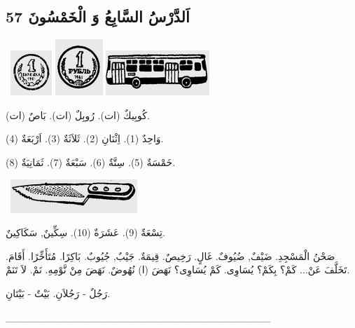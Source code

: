 \documentclass[a5paper]{article}
\begin{document}
\subsection{اَلدَّرْسُ السَّابِعُ وَ الْخَمْسُونَ 57 }
\  \includegraphics[width=0.6146in,height=0.6665in]{MuhammadBagauddinlatinized-img186.png}   \includegraphics[width=0.7083in,height=0.8335in]{MuhammadBagauddinlatinized-img187.png}   \includegraphics[width=1.5417in,height=0.6665in]{MuhammadBagauddinlatinized-img188.png} 

كُوبِيكٌ (ات). رُوبِلٌ (ات). بَاصٌ (ات). 

وَاحِدٌ (1). اِثْنَانِ (2). ثَلاَثَةٌ (3). اَرْبَعَةٌ (4). 

خَمْسَةٌ (5). سِتَّةٌ (6). سَبْعَةٌ (7). ثَمَانِيَةٌ (8). 

\  \includegraphics[width=1.8854in,height=0.5in]{MuhammadBagauddinlatinized-img189.png} 

تِسْعَةٌ (9). عَشَرَةٌ (10). سِكِّينٌ, سَكَاكِينٌ. 

صَحْنُ الْمَسْجِدِ. ضَيْفٌ, ضُيُوفٌ. غَالٍ. رَخِيصٌ. قِيمَةٌ. جَيْبٌ, جُيُوبٌ. بَاكِرًا. مُتَأَخِّرًا. أَقَامَ. تَخَلَّفَ عَنْ... كَمْ؟ بِكَمْ؟ يُسَاوِى. كَمْ يُسَاوِى؟ نَهَضَ (ا) نُهُوضٌ. نَهَضَ مِنْ نَّوْمِهِ. نَمْ. لاَ تَنَمْ. 

رَجُلٌ - رَجُلاَنِ. بَيْتٌ - بَيْتَانِ.

\_\_\_\_\_\_\_\_\_\_\_\_\_\_\_\_\_\_\_\_\_\_\_\_\_\_\_\_\_\_\_\_\_\_\_\_


\bigskip
\end{document}
